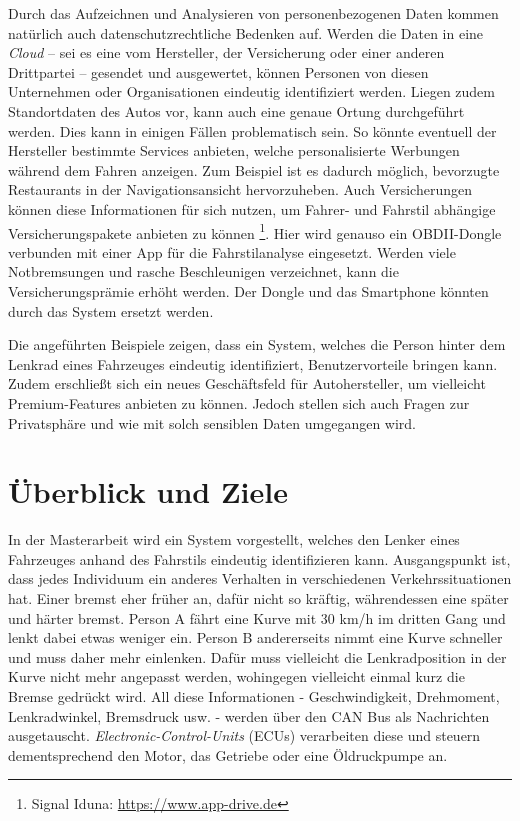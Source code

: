 Durch das Aufzeichnen und Analysieren von personenbezogenen Daten kommen natürlich auch datenschutzrechtliche Bedenken auf. Werden die Daten in eine \textit{Cloud} – sei es eine vom Hersteller, der Versicherung oder einer anderen Drittpartei – gesendet und ausgewertet, können Personen von diesen Unternehmen oder Organisationen eindeutig identifiziert werden. Liegen zudem Standortdaten des Autos vor, kann auch eine genaue Ortung durchgeführt werden. Dies kann in einigen Fällen problematisch sein. So könnte eventuell der Hersteller bestimmte Services anbieten, welche personalisierte Werbungen während dem Fahren anzeigen. Zum Beispiel ist es dadurch möglich, bevorzugte Restaurants in der Navigationsansicht hervorzuheben. Auch Versicherungen können diese Informationen für sich nutzen, um Fahrer- und Fahrstil abhängige Versicherungspakete anbieten zu können \footnote{Signal Iduna: \url{https://www.app-drive.de}}. Hier wird genauso ein OBDII-Dongle verbunden mit einer App für die Fahrstilanalyse eingesetzt. Werden viele Notbremsungen und rasche Beschleunigen verzeichnet, kann die Versicherungsprämie erhöht werden. Der Dongle und das Smartphone könnten durch das System ersetzt werden.

Die angeführten Beispiele zeigen, dass ein System, welches die Person hinter dem Lenkrad eines Fahrzeuges eindeutig identifiziert, Benutzervorteile bringen kann. Zudem erschließt sich ein neues Geschäftsfeld für Autohersteller, um vielleicht Premium-Features anbieten zu können. Jedoch stellen sich auch Fragen zur Privatsphäre und wie mit solch sensiblen Daten umgegangen wird.

\section{Überblick und Ziele}
\label{sec:overview}

In der Masterarbeit wird ein System vorgestellt, welches den Lenker eines Fahrzeuges anhand des Fahrstils eindeutig identifizieren kann. Ausgangspunkt ist, dass jedes Individuum ein anderes Verhalten in verschiedenen Verkehrssituationen hat. Einer bremst eher früher an, dafür nicht so kräftig, währendessen eine später und härter bremst. Person A fährt eine Kurve mit 30 km/h im dritten Gang und lenkt dabei etwas weniger ein. Person B andererseits nimmt eine Kurve schneller und muss daher mehr einlenken. Dafür muss vielleicht die Lenkradposition in der Kurve nicht mehr angepasst werden, wohingegen vielleicht einmal kurz die Bremse gedrückt wird. All diese Informationen - Geschwindigkeit, Drehmoment, Lenkradwinkel, Bremsdruck usw. - werden über den CAN Bus als Nachrichten ausgetauscht. \textit{Electronic-Control-Units} (ECUs) verarbeiten diese und steuern dementsprechend den Motor, das Getriebe oder eine Öldruckpumpe an.


